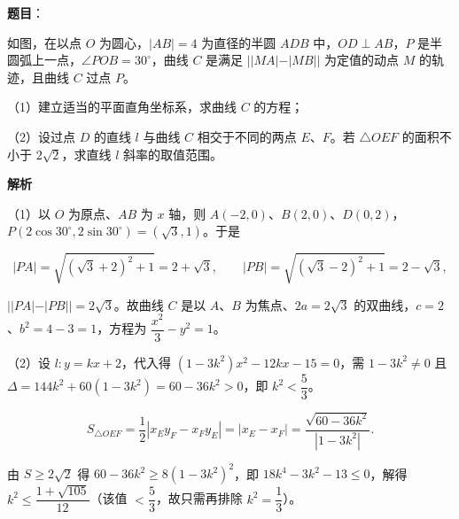 \begin{answer}

\textbf{题目}：

如图，在以点 $O$ 为圆心，$|AB|=4$ 为直径的半圆 $ADB$ 中，$OD\perp AB$，$P$ 是半圆弧上一点，$\angle POB=30^\circ$，曲线 $C$ 是满足 $||MA|-|MB||$ 为定值的动点 $M$ 的轨迹，且曲线 $C$ 过点 $P$。

（1）建立适当的平面直角坐标系，求曲线 $C$ 的方程；

（2）设过点 $D$ 的直线 $l$ 与曲线 $C$ 相交于不同的两点 $E$、$F$。若 $\triangle OEF$ 的面积不小于 $2\sqrt2$，求直线 $l$ 斜率的取值范围。
\nopagebreak[4]
\begin{center}\end{center}
\nopagebreak[4]
\textbf{解析}

（1）以 $O$ 为原点、$AB$ 为 $x$ 轴，则 $A(-2,0)$、$B(2,0)$、$D(0,2)$，$P(2\cos30^\circ,2\sin30^\circ)=(\sqrt3,1)$。于是

\nopagebreak[4]
\[|PA|=\sqrt{(\sqrt3+2)^2+1}=2+\sqrt3,\qquad |PB|=\sqrt{(\sqrt3-2)^2+1}=2-\sqrt3,\]

$||PA|-|PB||=2\sqrt3$。故曲线 $C$ 是以 $A$、$B$ 为焦点、$2a=2\sqrt3$ 的双曲线，$c=2$、$b^2=4-3=1$，方程为 $\dfrac{x^2}3-y^2=1$。

（2）设 $l:y=kx+2$，代入得 $(1-3k^2)x^2-12kx-15=0$，需 $1-3k^2\neq0$ 且 $\Delta=144k^2+60(1-3k^2)=60-36k^2>0$，即 $k^2<\dfrac53$。

\nopagebreak[4]
\[S_{\triangle OEF}=\frac12|x_Ey_F-x_Fy_E|=|x_E-x_F|=\frac{\sqrt{60-36k^2}}{|1-3k^2|}.\]

由 $S\geqslant2\sqrt2$ 得 $60-36k^2\geqslant8(1-3k^2)^2$，即 $18k^4-3k^2-13\leqslant0$，解得 $k^2\leqslant\dfrac{1+\sqrt{105}}{12}$（该值 $<\dfrac53$，故只需再排除 $k^2=\dfrac13$）。


\end{answer}
